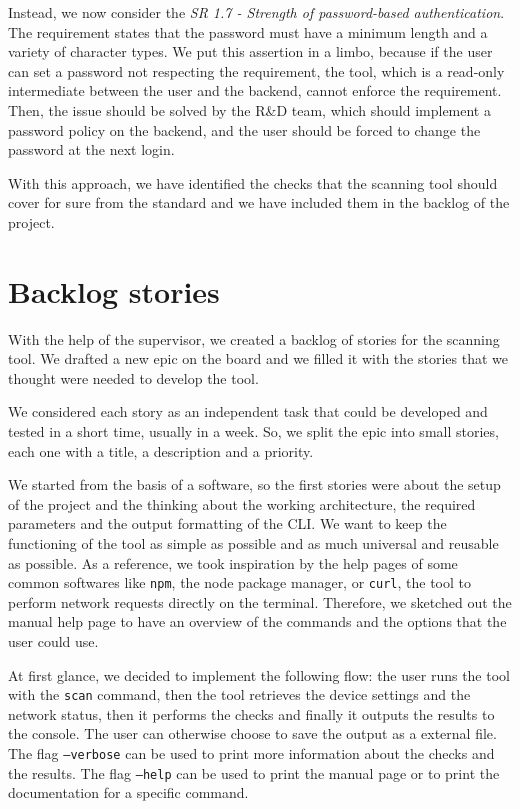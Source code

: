 Instead, we now consider the \textit{SR 1.7 - Strength of password-based authentication}. The requirement states that the password must have a minimum length and a variety of character types. We put this assertion in a limbo, because if the user can set a password not respecting the requirement, the tool, which is a read-only intermediate between the user and the backend, cannot enforce the requirement. Then, the issue should be solved by the R\&D team, which should implement a password policy on the backend, and the user should be forced to change the password at the next login.

With this approach, we have identified the checks that the scanning tool should cover for sure from the standard and we have included them in the backlog of the project.

\section{Backlog stories}

With the help of the supervisor, we created a backlog of stories for the scanning tool. We drafted a new epic on the board and we filled it with the stories that we thought were needed to develop the tool.

We considered each story as an independent task that could be developed and tested in a short time, usually in a week. So, we split the epic into small stories, each one with a title, a description and a priority.

We started from the basis of a software, so the first stories were about the setup of the project and the thinking about the working architecture, the required parameters and the output formatting of the CLI. We want to keep the functioning of the tool as simple as possible and as much universal and reusable as possible. As a reference, we took inspiration by the help pages of some common softwares like \texttt{npm}, the node package manager, or \texttt{curl}, the tool to perform network requests directly on the terminal. Therefore, we sketched out the manual help page to have an overview of the commands and the options that the user could use.

At first glance, we decided to implement the following flow: the user runs the tool with the \texttt{scan} command, then the tool retrieves the device settings and the network status, then it performs the checks and finally it outputs the results to the console. The user can otherwise choose to save the output as a external file. The flag \texttt{--verbose} can be used to print more information about the checks and the results. The flag \texttt{--help} can be used to print the manual page or to print the documentation for a specific command.

